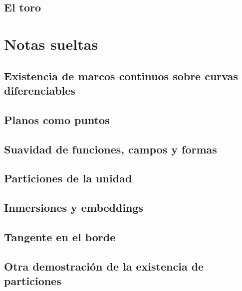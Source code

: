 \documentclass[11pt]{report}
\begin{document}
\section{El toro}
%
%


\chapter{Notas sueltas}

\section{Existencia de marcos continuos sobre curvas diferenciables}
%
%
\section{Planos como puntos}
%
\section{Suavidad de funciones, campos y formas}

\section{Particiones de la unidad}

\section{Inmersiones y embeddings}

\section{Tangente en el borde}

\section{Otra demostraci\'{o}n de la existencia de particiones}


\begin{thebibliography}{9}
%
\end{thebibliography}
\end{document}
